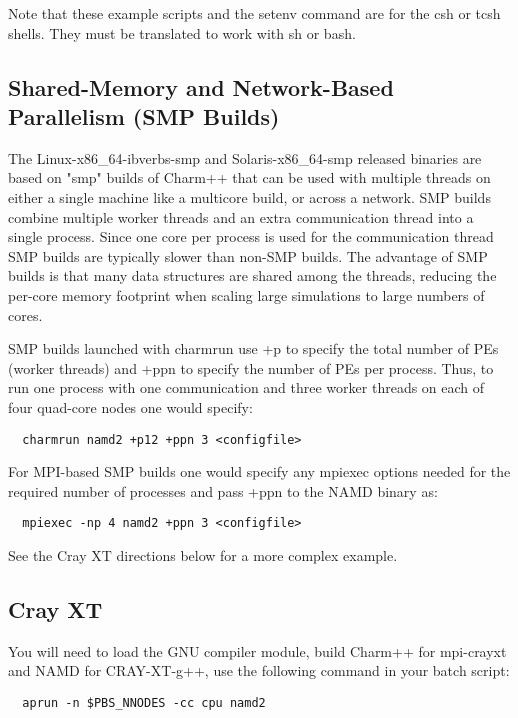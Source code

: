 Note that these example scripts and the setenv command are for the csh
or tcsh shells.  They must be translated to work with sh or bash.

\subsection{Shared-Memory and Network-Based Parallelism (SMP Builds)}

The Linux-x86\_64-ibverbs-smp and Solaris-x86\_64-smp released binaries are
based on "smp" builds of Charm++ that can be used with multiple threads
on either a single machine like a multicore build, or across a network.
SMP builds combine multiple worker threads and an extra communication
thread into a single process.  Since one core per process is used for
the communication thread SMP builds are typically slower than non-SMP
builds.  The advantage of SMP builds is that many data structures are
shared among the threads, reducing the per-core memory footprint when
scaling large simulations to large numbers of cores.

SMP builds launched with charmrun use +p to specify the total number of
PEs (worker threads) and +ppn to specify the number of PEs per process.
Thus, to run one process with one communication and three worker threads
on each of four quad-core nodes one would specify:

\begin{verbatim}
  charmrun namd2 +p12 +ppn 3 <configfile>
\end{verbatim}

For MPI-based SMP builds one would specify any mpiexec options needed
for the required number of processes and pass +ppn to the NAMD binary as:

\begin{verbatim}
  mpiexec -np 4 namd2 +ppn 3 <configfile>
\end{verbatim}

See the Cray XT directions below for a more complex example.

\subsection{Cray XT}

You will need to load the GNU compiler module, build Charm++ for mpi-crayxt
and NAMD for CRAY-XT-g++, use the following command in your batch script:

\begin{verbatim}
  aprun -n $PBS_NNODES -cc cpu namd2
\end{verbatim}

